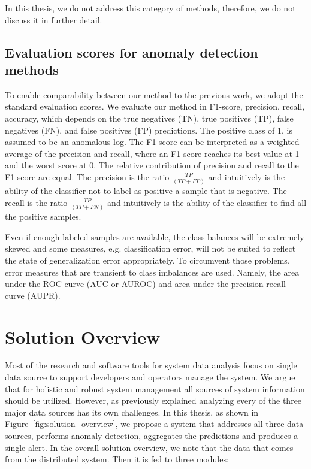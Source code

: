 In this thesis, we do not address this category of methods, therefore, we do not discuss it in further detail.

\subsection{Evaluation scores for anomaly detection methods}
To enable comparability between our method to the previous work, we adopt the standard evaluation scores. We evaluate our method in F1-score, precision, recall, accuracy, which depends on the true negatives (TN), true positives (TP), false negatives (FN), and false positives (FP) predictions. The positive class of 1, is assumed to be an anomalous log. The F1 score can be interpreted as a weighted average of the precision and recall, where an F1 score reaches its best value at 1 and the worst score at 0. The relative contribution of precision and recall to the F1 score are equal. The precision is the ratio $\frac{TP}{(TP + FP)}$ and intuitively is the ability of the classifier not to label as positive a sample that is negative. The recall is the ratio $\frac{TP}{(TP + FN)}$ and intuitively is the ability of the classifier to find all the positive samples.

Even if enough labeled samples are available, the class balances will be extremely skewed and some measures, e.g. classification error, will not be suited to reflect the state of generalization error appropriately. To circumvent those problems, error measures that are transient to class imbalances are used. Namely, the area under the ROC curve (AUC or AUROC) and area under the precision recall curve (AUPR).

\section{Solution Overview}

Most of the research and software tools for system data analysis focus on single data source to support developers and operators manage the system. We argue that for holistic and robust system management all sources of system information should be utilized. However, as previously explained analyzing every of the three major data sources has its own challenges. In this thesis, as shown in Figure~\ref{fig:solution_overview}, we propose a system that addresses all three data sources, performs anomaly detection, aggregates the predictions and produces a single alert. In the overall solution overview, we note that the data that comes from the distributed system. Then it is fed to three modules:

